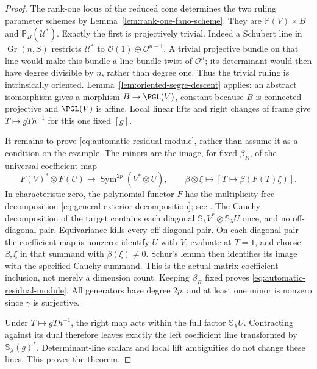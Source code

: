 \documentclass[11pt,reqno]{amsart}
\numberwithin{equation}{section}
\theoremstyle{definition}\newtheorem{definition}[theorem]{Definition}
\theoremstyle{remark}\newtheorem{remark}[theorem]{Remark}
\newcommand{\Pj}{\mathbb P}\newcommand{\A}{\mathbb A}
\newcommand{\OO}{\mathcal O}\newcommand{\II}{\mathcal I}
\DeclareMathOperator{\Sym}{Sym}\DeclareMathOperator{\Gr}{Gr}
\begin{document}
\begin{proof}
The rank-one locus of the reduced cone determines the two ruling
parameter schemes by Lemma~\ref{lem:rank-one-fano-scheme}.  They are
\(\Pj(V)\times B\) and \(\Pj_B(\mathcal U^*)\).
Exactly the first is projectively trivial.  Indeed a Schubert line in
\(\Gr(n,S)\) restricts \(\mathcal U^*\) to
\(\OO(1)\oplus\OO^{n-1}\).  A trivial projective bundle on
that line would make this bundle a line-bundle twist of
\(\OO^n\); its determinant would then have degree divisible by
\(n\), rather than degree one.  Thus the trivial ruling is
intrinsically oriented.  Lemma~\ref{lem:oriented-segre-descent}
applies: an abstract isomorphism gives a morphism \(B\to\PGL(V)\),
constant because \(B\) is connected projective and \(\PGL(V)\)
is affine.  Local linear lifts and right changes of frame give
\(T\mapsto gTh^{-1}\) for this one fixed \([g]\).

It remains to prove \eqref{eq:automatic-residual-module}, rather
than assume it as a condition on the example.  The minors are the
image, for fixed \(\beta_R\), of the universal coefficient map
\begin{equation}\label{eq:general-coefficient-map}
 F(V)^*\otimes F(U)\longrightarrow
 \Sym^{2p}(V^*\otimes U),\qquad
 \beta\otimes\xi\longmapsto[T\mapsto\beta(F(T)\xi)].
\end{equation}
In characteristic zero, the polynomial functor \(F\) has the
multiplicity-free decomposition \eqref{eq:general-exterior-decomposition};
see \cite[Theorem~3.5]{ChengWang}.  The Cauchy decomposition of the
target contains each diagonal
\(\mathbb S_\lambda V^*\otimes\mathbb S_\lambda U\)
once, and no off-diagonal pair.  Equivariance kills every
off-diagonal pair.  On each diagonal pair the coefficient map is
nonzero: identify \(U\) with \(V\), evaluate at \(T=1\), and
choose \(\beta,\xi\) in that summand with
\(\beta(\xi)\ne0\).  Schur's lemma then identifies its image
with the specified Cauchy summand.  This is the actual matrix-coefficient
inclusion, not merely a dimension count.  Keeping \(\beta_R\)
fixed proves \eqref{eq:automatic-residual-module}.  All generators
have degree \(2p\), and at least one minor is nonzero since
\(\gamma\) is surjective.

Under \(T\mapsto gTh^{-1}\), the right map acts within the full
factor \(\mathbb S_\lambda U\).  Contracting against its dual
therefore leaves exactly the left coefficient line transformed by
\(\mathbb S_\lambda(g)^*\).  Determinant-line scalars and local
lift ambiguities do not change these lines.  This proves the theorem.
\end{proof}
\end{document}
